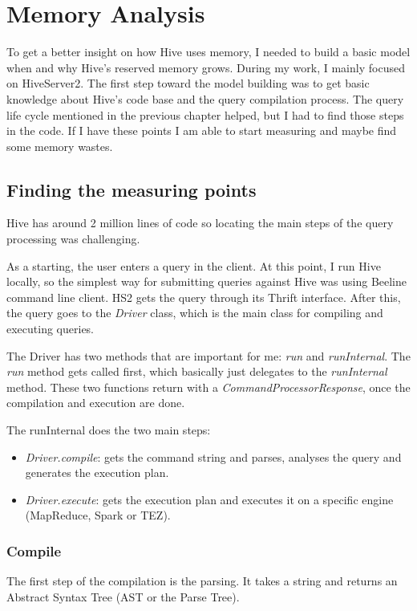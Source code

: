 \chapter{Memory Analysis}
To get a better insight on how Hive uses memory, I needed to build a basic model when and why Hive's reserved memory grows. During my work, I mainly focused on HiveServer2. The first step toward the model building was to get basic knowledge about Hive's code base and the query compilation process. The query life cycle mentioned in the previous chapter helped, but I had to find those steps in the code. If I have these points I am able to start measuring and maybe find some memory wastes.

\section{Finding the measuring points}
Hive has around 2 million lines of code so locating the main steps of the query processing was challenging. 

As a starting, the user enters a query in the client. At this point, I run Hive locally, so the simplest way for submitting queries against Hive was using Beeline command line client. HS2 gets the query through its Thrift interface. After this, the query goes to the \textit{Driver} class, which is the main class for compiling and executing queries.

The Driver has two methods that are important for me: \textit{run} and \textit{runInternal}. The \textit{run} method gets called first, which basically just delegates to the \textit{runInternal} method. These two functions return with a \textit{CommandProcessorResponse}, once the compilation and execution are done. 

\noindent The runInternal does the two main steps:
\begin{itemize}
	\item \textit{Driver.compile}: gets the command string and parses, analyses the query and generates the execution plan.
	\item \textit{Driver.execute}: gets the execution plan and executes it on a specific engine (MapReduce, Spark or TEZ).
\end{itemize}

\subsection{Compile}
The first step of the compilation is the parsing. It takes a string and returns an Abstract Syntax Tree (AST or the Parse Tree).


